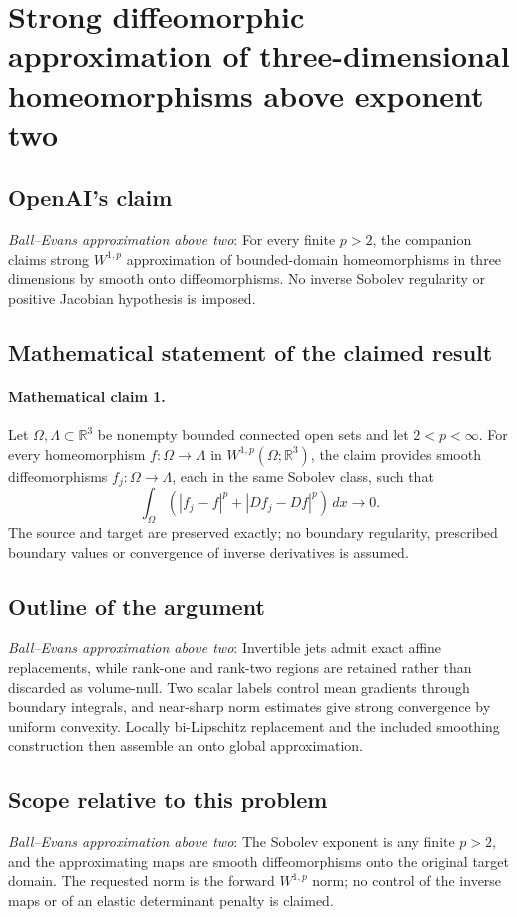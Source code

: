 \documentclass[11pt]{article}
\begin{document}
\section*{Strong diffeomorphic approximation of three-dimensional homeomorphisms above exponent two}

\subsection{OpenAI's claim}
\textit{Ball--Evans approximation above two}: For every finite $p>2$, the companion claims strong $W^{1,p}$ approximation of bounded-domain homeomorphisms in three dimensions by smooth onto diffeomorphisms. No inverse Sobolev regularity or positive Jacobian hypothesis is imposed.

\subsection{Mathematical statement of the claimed result}
\paragraph{Mathematical claim 1.} Let $\Omega,\Lambda\subset\mathbb R^3$ be nonempty bounded connected open sets and let $2<p<\infty$. For every homeomorphism $f:\Omega\to\Lambda$ in $W^{1,p}(\Omega;\mathbb R^3)$, the claim provides smooth diffeomorphisms $f_j:\Omega\to\Lambda$, each in the same Sobolev class, such that \[\int_\Omega(|f_j-f|^p+|Df_j-Df|^p)\,dx\longrightarrow0.\] The source and target are preserved exactly; no boundary regularity, prescribed boundary values or convergence of inverse derivatives is assumed.

\subsection{Outline of the argument}
\textit{Ball--Evans approximation above two}: Invertible jets admit exact affine replacements, while rank-one and rank-two regions are retained rather than discarded as volume-null. Two scalar labels control mean gradients through boundary integrals, and near-sharp norm estimates give strong convergence by uniform convexity. Locally bi-Lipschitz replacement and the included smoothing construction then assemble an onto global approximation.

\subsection{Scope relative to this problem}
\textit{Ball--Evans approximation above two}: The Sobolev exponent is any finite $p>2$, and the approximating maps are smooth diffeomorphisms onto the original target domain. The requested norm is the forward $W^{1,p}$ norm; no control of the inverse maps or of an elastic determinant penalty is claimed.
\end{document}
